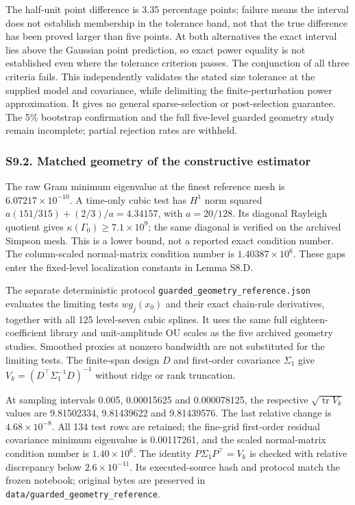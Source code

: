 \documentclass[
  american,
  11pt,
]{article}
\begin{document}
The half-unit point difference is 3.35 percentage points; failure means
the interval does not establish membership in the tolerance band, not
that the true difference has been proved larger than five points. At
both alternatives the exact interval lies above the Gaussian point
prediction, so exact power equality is not established even where the
tolerance criterion passes. The conjunction of all three criteria fails.
This independently validates the stated size tolerance at the supplied
model and covariance, while delimiting the finite-perturbation power
approximation. It gives no general sparse-selection or post-selection
guarantee. The 5\% bootstrap confirmation and the full five-level
guarded geometry study remain incomplete; partial rejection rates are
withheld.

\subsubsection{S9.2. Matched geometry of the constructive
estimator}\label{s9.2.-matched-geometry-of-the-constructive-estimator}

The raw Gram minimum eigenvalue at the finest reference mesh is
\(6.07217\times10^{-10}\). A time-only cubic test has \(H^1\) norm
squared \(a(151/315)+(2/3)/a=4.34157\), with \(a=20/128\). Its diagonal
Rayleigh quotient gives \(\kappa(\Gamma_0)\geq7.1\times10^9\); the same
diagonal is verified on the archived Simpson mesh. This is a lower
bound, not a reported exact condition number. The column-scaled
normal-matrix condition number is \(1.40387\times10^6\). These gaps
enter the fixed-level localization constants in Lemma S8.D.

The separate deterministic protocol
\texttt{guarded\_geometry\_reference.json} evaluates the limiting tests
\(w g_j(x_0)\) and their exact chain-rule derivatives, together with all
125 level-seven cubic splines. It uses the same full
eighteen-coefficient library and unit-amplitude OU scales as the five
archived geometry studies. Smoothed proxies at nonzero bandwidth are not
substituted for the limiting tests. The finite-span design \(D\) and
first-order covariance \(\Sigma_1\) give
\(V_k=(D^\top\Sigma_1^{-1}D)^{-1}\) without ridge or rank truncation.

At sampling intervals 0.005, 0.00015625 and 0.000078125, the respective
\(\sqrt{\operatorname{tr}V_k}\) values are 9.81502334, 9.81439622 and
9.81439576. The last relative change is \(4.68\times10^{-8}\). All 134
test rows are retained; the fine-grid first-order residual covariance
minimum eigenvalue is 0.00117261, and the scaled normal-matrix condition
number is \(1.40\times10^6\). The identity \(P\Sigma_1P^\top=V_k\) is
checked with relative discrepancy below \(2.6\times10^{-11}\). Its
executed-source hash and protocol match the frozen notebook; original
bytes are preserved in \texttt{data/guarded\_geometry\_reference}.
\end{document}
